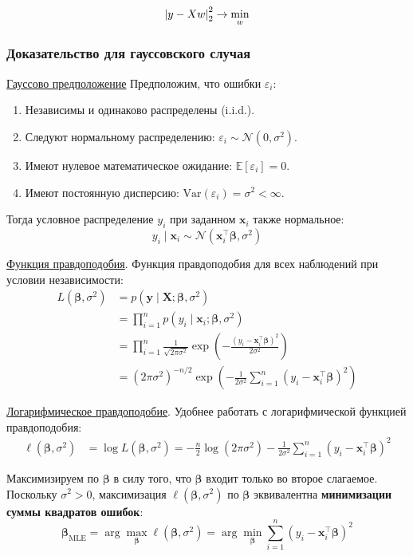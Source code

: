 \[ \abs{y - X w}^2_2 \rightarrow \min_w \]

\subsubsection{Доказательство для гауссовского случая}

\underline{Гауссово предположение}
Предположим, что ошибки $\varepsilon_i$:
\begin{enumerate}
    \item Независимы и одинаково распределены (i.i.d.).
    \item Следуют нормальному распределению: $\varepsilon_i \sim \mathcal{N}(0, \sigma^2)$.
    \item Имеют нулевое математическое ожидание: $\mathbb{E}[\varepsilon_i] = 0$.
    \item Имеют постоянную дисперсию: $\text{Var}(\varepsilon_i) = \sigma^2 < \infty$.
\end{enumerate}

Тогда условное распределение $y_i$ при заданном $\bm{x}_i$ также нормальное:
\[ y_i \mid \bm{x}_i \sim \mathcal{N}(\bm{x}_i^\top \bm{\beta}, \sigma^2) \]

\underline{Функция правдоподобия}.
Функция правдоподобия для всех наблюдений при условии независимости:
\begin{align*}
    L(\bm{\beta}, \sigma^2) &= p(\bm{y} \mid \bm{X}; \bm{\beta}, \sigma^2) \\
    &= \prod_{i=1}^n p(y_i \mid \bm{x}_i; \bm{\beta}, \sigma^2) \\
    &= \prod_{i=1}^n \frac{1}{\sqrt{2\pi\sigma^2}} \exp\left(-\frac{(y_i - \bm{x}_i^\top \bm{\beta})^2}{2\sigma^2}\right) \\
    &= (2\pi\sigma^2)^{-n/2} \exp\left(-\frac{1}{2\sigma^2} \sum_{i=1}^n (y_i - \bm{x}_i^\top \bm{\beta})^2\right)
\end{align*}

\underline{Логарифмическое правдоподобие}.
Удобнее работать с логарифмической функцией правдоподобия:
\begin{align*}
    \ell(\bm{\beta}, \sigma^2) &= \log L(\bm{\beta}, \sigma^2) = -\frac{n}{2} \log(2\pi\sigma^2) - \frac{1}{2\sigma^2} \sum_{i=1}^n (y_i - \bm{x}_i^\top \bm{\beta})^2
\end{align*}

Максимизируем по $\bm{\beta}$ в силу того, что $\bm{\beta}$ входит только во второе слагаемое.
Поскольку $\sigma^2 > 0$, максимизация $\ell(\bm{\beta}, \sigma^2)$ по $\bm{\beta}$ эквивалентна \textbf{минимизации суммы квадратов ошибок}:
\[ \bm{\beta}_{\text{MLE}} = \arg\max_{\bm{\beta}} \ell(\bm{\beta}, \sigma^2) = \arg\min_{\bm{\beta}} \sum_{i=1}^n
(y_i - \bm{x}_i^\top \bm{\beta})^2 \]

